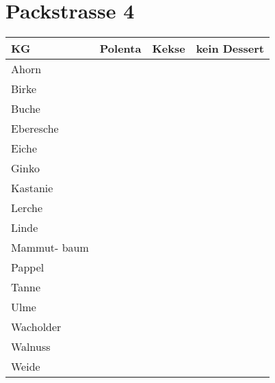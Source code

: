 \documentclass[14pt]{article}
\begin{document}
\section{Packstrasse 4}

\begin{tabular}{l|l|l|l}
  \toprule
  KG  &Polenta&Kekse&kein Dessert\\
  \midrule
Ahorn&&&\\


Birke&&&\\


Buche&&&\\


Eberesche&&&\\


Eiche&&&\\


Ginko&&&\\


Kastanie&&&\\



Lerche&&&\\


Linde&&&\\


Mammut-
baum&&&\\


Pappel&&&\\


Tanne&&&\\


Ulme&&&\\


Wacholder&&&\\


Walnuss&&&\\


  Weide&&&\\
  \bottomrule

\end{tabular}
\end{document}
